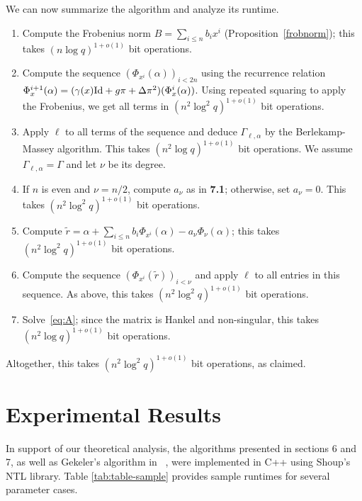 \documentclass[sigconf]{acmart}
\begin{document}
\smallskip{} We can now summarize the algorithm and
analyze its runtime.
\begin{enumerate}
\item Compute the Frobenius norm $B=\sum_{i \le n} b_i x^i$ (Proposition~\ref{frobnorm});
this takes $(n \log q)^{1+o(1)}$ bit operations.
\item Compute the sequence $(\Phi_{x^{i}}(\alpha))_{i < 2n}$ using the
  recurrence relation $\Phi_x^{i+1}(\alpha) = (\gamma(x) {\rm Id} +
  g\pi + \Delta \pi^2)(\Phi_x^i(\alpha))$. Using repeated squaring to
  apply the Frobenius, we get all terms in $(n^2 \log^2 q)^{1+o(1)}$ bit
  operations.
\item Apply $\ell$ to all terms of the sequence and deduce
  $\Gamma_{\ell,\alpha}$ by the Berlekamp-Massey algorithm. This takes
  $(n^2 \log q)^{1+o(1)}$ bit operations. We assume
  $\Gamma_{\ell,\alpha}=\Gamma$ and let $\nu$ be its degree.
\item If $n$ is even and $\nu=n/2$, compute $a_\nu$ as in {\bf 7.1};
  otherwise, set $a_\nu=0$. This takes $(n^2 \log^2 q)^{1+o(1)}$ bit
  operations.
\item Compute $\tilde r = \alpha + \sum_{i \le n} b_i
  \Phi_{x^{i}}(\alpha) - a_\nu \Phi_\nu(\alpha)$; this takes $(n^2
  \log^2 q)^{1+o(1)}$ bit operations.
\item Compute the sequence $(\Phi_{x^{i}}(\tilde r))_{i < \nu}$
  and apply $\ell$ to all entries in this sequence. As above, this takes
 $(n^2 \log^2 q)^{1+o(1)}$ bit
  operations.
\item Solve~\eqref{eq:A}; since the matrix is Hankel and non-singular,
  this takes $(n^2 \log q)^{1+o(1)}$ bit operations.
\end{enumerate}
Altogether, this takes  $(n^2 \log^2 q)^{1+o(1)}$ bit operations,
as claimed.


\section{Experimental Results}\label{sec:mc}

In support of our theoretical analysis, the algorithms presented in sections 6 and 7, as well as Gekeler's algorithm in ~\cite[Section 3 ]{frobdist}, were implemented in C++ using Shoup's NTL library. Table \ref{tab:table-sample} provides sample runtimes for several parameter cases.
\end{document}
